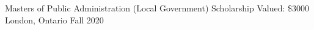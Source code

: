 \begin{cvhonors}

  \cvhonor
    {Masters of Public Administration (Local Government) Scholarship} %
    {Valued: \$3000} %
    {London, Ontario} %
    {Fall 2020} %







\end{cvhonors}

